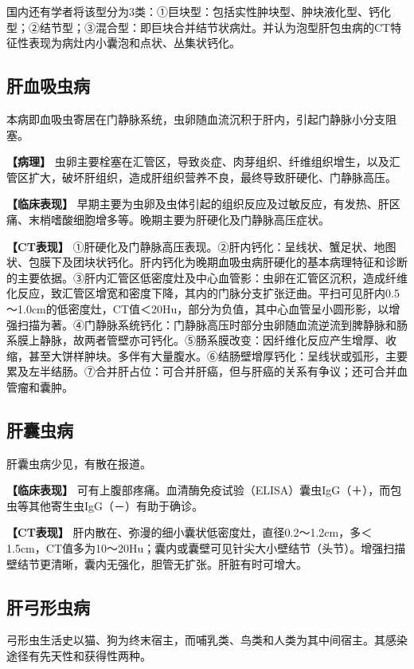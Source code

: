 国内还有学者将该型分为3类：①巨块型：包括实性肿块型、肿块液化型、钙化型；②结节型；③混合型：即巨块合并结节状病灶。并认为泡型肝包虫病的CT特征性表现为病灶内小囊泡和点状、丛集状钙化。

\subsection{肝血吸虫病}

本病即血吸虫寄居在门静脉系统，虫卵随血流沉积于肝内，引起门静脉小分支阻塞。

\textbf{【病理】}
虫卵主要栓塞在汇管区，导致炎症、肉芽组织、纤维组织增生，以及汇管区扩大，破坏肝组织，造成肝组织营养不良，最终导致肝硬化、门静脉高压。

\textbf{【临床表现】}
早期主要为虫卵及虫体引起的组织反应及过敏反应，有发热、肝区痛、末梢嗜酸细胞增多等。晚期主要为肝硬化及门静脉高压症状。

\textbf{【CT表现】}
①肝硬化及门静脉高压表现。②肝内钙化：呈线状、蟹足状、地图状、包膜下及团块状钙化。肝内钙化为晚期血吸虫病肝硬化的基本病理特征和诊断的主要依据。③肝内汇管区低密度灶及中心血管影：虫卵在汇管区沉积，造成纤维化反应，致汇管区增宽和密度下降，其内的门脉分支扩张迂曲。平扫可见肝内0.5～1.0cm的低密度灶，CT值＜20Hu，部分为负值，其中心血管呈小圆形影，以增强扫描为著。④门静脉系统钙化：门静脉高压时部分虫卵随血流逆流到脾静脉和肠系膜上静脉，故两者管壁亦可钙化。⑤肠系膜改变：因纤维化反应产生增厚、收缩，甚至大饼样肿块。多伴有大量腹水。⑥结肠壁增厚钙化：呈线状或弧形，主要累及左半结肠。⑦合并肝占位：可合并肝癌，但与肝癌的关系有争议；还可合并血管瘤和囊肿。

\subsection{肝囊虫病}

肝囊虫病少见，有散在报道。

\textbf{【临床表现】}
可有上腹部疼痛。血清酶免疫试验（ELISA）囊虫IgG（＋），而包虫等其他寄生虫IgG（－）有助于确诊。

\textbf{【CT表现】}
肝内散在、弥漫的细小囊状低密度灶，直径0.2～1.2cm，多＜1.5cm，CT值多为10～20Hu；囊内或囊壁可见针尖大小壁结节（头节）。增强扫描壁结节更清晰，囊内无强化，胆管无扩张。肝脏有时可增大。

\subsection{肝弓形虫病}

弓形虫生活史以猫、狗为终末宿主，而哺乳类、鸟类和人类为其中间宿主。其感染途径有先天性和获得性两种。

